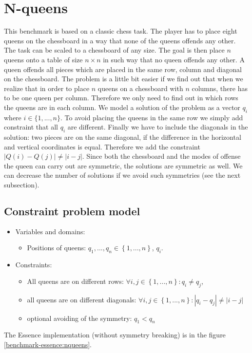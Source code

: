 \section{N-queens}
This benchmark is based on a classic chess task. The player has to place eight queens
on the chessboard in a way that none of the queens offends any other. The task
can be scaled to a chessboard of any size. The goal is then place $n$ queens 
onto a table of size $n \times n$ in such way that no queen offends any other. A queen
offends all pieces which are placed in the same row, column and diagonal on the chessboard.
The problem is a little bit easier if we find out that when we realize that in order to place $n$ queens
on a chessboard with $n$ columns, there has to be one queen per column. Therefore 
we only need to find out in which rows the queens are in each column. We model a
solution of the problem as a vector $q_i$ where $i \in \{1,...,n\}$. To avoid
placing the queens in the same row we simply add constraint that all $q_i$ are 
different. Finally we have to include the diagonals in the solution: two pieces are on the same diagonal, 
if the difference in the horizontal and vertical coordinates is equal. Therefore we 
add the constraint $\left|Q(i) - Q(j)\right| \neq \left|i - j\right|$.
Since both the chessboard and the modes of offense the queen can carry out are symmetric, the solutions are symmetric as well.
We can decrease the number of solutions if we avoid such symmetries (see the next subsection).

\subsection{Constraint problem model}
\begin{itemize}
	\item Variables and domains: 
    \begin{itemize}
      \item Positions of queens: $q_1, ..., q_n \in \left\{1, ..., n \right\}$, $q_i$.
    \end{itemize}
	\item Constraints:
    \begin{itemize}
     \item All queens are on different rows: $\forall i,j \in \left\{1, ..., n\right\}: q_i \neq q_j$,
	   \item all queens are on different diagonals: $\forall i,j \in \left\{1, ..., n\right\}: |q_i - q_j| \neq |i - j|$
	   \item optional avoiding of the symmetry: $q_1 < q_n$
	  \end{itemize}
\end{itemize}
The Essence implementation (without symmetry breaking) is in the figure \ref{benchmark-essence:nqueens}.

